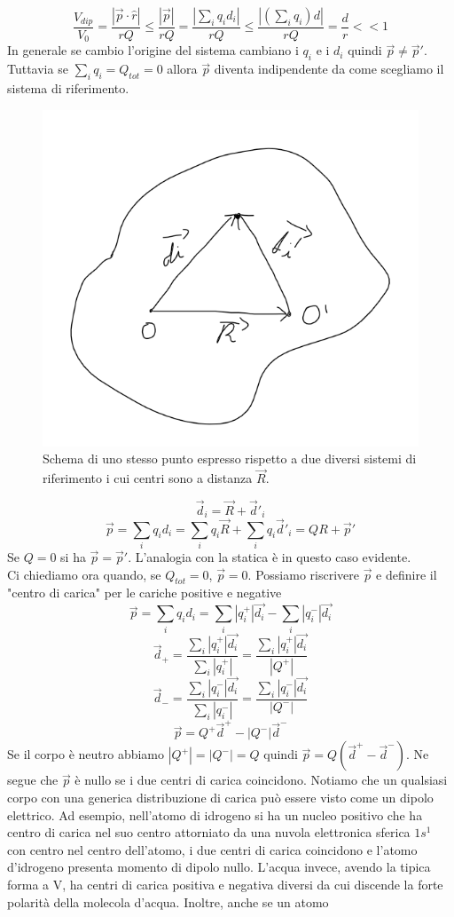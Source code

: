 \documentclass[10pt,a4paper]{article}
\begin{document}
 \[\frac{V_{dip}}{V_0} = \frac{|\vec{p}\cdot \hat{r}|}{rQ}\leq\frac{|\vec{p}|}{rQ} = \frac{|\sum_i q_i d_i|}{rQ}\leq \frac{|(\sum_i q_i)d|}{rQ} = \frac{d}{r}<<1\]
 In generale se cambio l'origine del sistema cambiano i \(q_i\) e i \(d_i\) quindi \(\vec{p}\neq\vec{p}'\). Tuttavia se \(\sum_i q_i = Q_{tot} = 0\) allora $\vec{p}$ diventa indipendente da come scegliamo il sistema di riferimento. 
\begin{figure}[h!]
	\centering
	\includegraphics[width=0.5\linewidth]{images/dipolo_SR}
	\caption{Schema di uno stesso punto espresso rispetto a due diversi sistemi di riferimento i cui centri sono a distanza \(\vec{R}\).}
	\label{fig:dipolosr}
\end{figure}
\FloatBarrier
\[\vec{d}_i = \vec{R}+\vec{d}'_i\]
\[\vec{p} = \sum_iq_id_i = \sum_iq_i\vec{R}+\sum_iq_i\vec{d}'_i=QR+\vec{p}'\]
Se \(Q = 0\) si ha \(\vec{p} = \vec{p}'\). L'analogia con la statica è in questo caso evidente.\\
Ci chiediamo ora quando, se \(Q_{tot} = 0\), $\vec{p} = 0$. Possiamo riscrivere $\vec{p}$ e definire il "centro di carica" per le cariche positive e negative 
\[\vec{p} = \sum_iq_id_i = \sum_i|q_i^+|\vec{d_i}-\sum_i|q_i^-|\vec{d_i}\]
\[\vec{d}_+ = \frac{\sum_i|q_i^+|\vec{d_i}}{\sum_i|q_i^+|} = \frac{\sum_i|q_i^+|\vec{d_i}}{|Q^+|}\]
\[\vec{d}_- = \frac{\sum_i|q_i^-|\vec{d_i}}{\sum_i|q_i^-|} = \frac{\sum_i|q_i^-|\vec{d_i}}{|Q^-|}\]
\[\vec{p} = Q^+\vec{d}^+-|Q^-|\vec{d}^-\]
Se il corpo è neutro abbiamo \(|Q^+|=|Q^-|=Q\) quindi \(\vec{p} = Q(\vec{d}^+-\vec{d}^-)\). Ne segue che $\vec{p}$ è nullo se i due centri di carica coincidono. Notiamo che un qualsiasi corpo con una generica distribuzione di carica può essere visto come un dipolo elettrico. Ad esempio, nell'atomo di idrogeno si ha un nucleo positivo che ha centro di carica nel suo centro attorniato da una nuvola elettronica sferica \(1s^1\) con centro nel centro dell'atomo, i due centri di carica coincidono e l'atomo d'idrogeno presenta momento di dipolo nullo. L'acqua invece, avendo la tipica forma a V, ha centri di carica positiva e negativa diversi da cui discende la forte polarità della molecola d'acqua. Inoltre, anche se un atomo 
\end{document}

